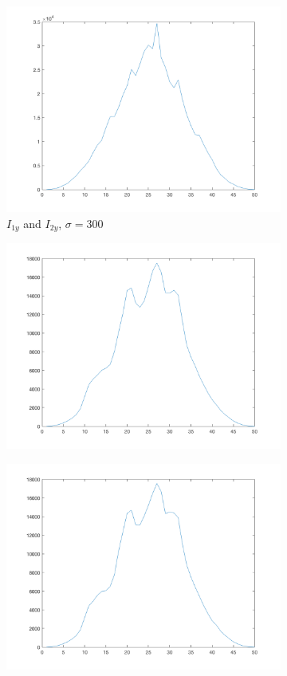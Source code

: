 \begin{figure}[htpb]
\begin{subfigure}{.25\textwidth}
\includegraphics[width=1\textwidth]{img/ProjXI2sigma300}
\caption{$I_{1y}$ and $I_{2y}$, $\sigma\!=\!300$}
\end{subfigure}
\quad
\begin{subfigure}{.25\textwidth}
\includegraphics[width=1\textwidth]{img/ProjYI1sigma0}
\end{subfigure}%
\begin{subfigure}{.25\textwidth}
\includegraphics[width=1\textwidth]{img/ProjYI1sigma75}

\end{subfigure}
\end{figure}
